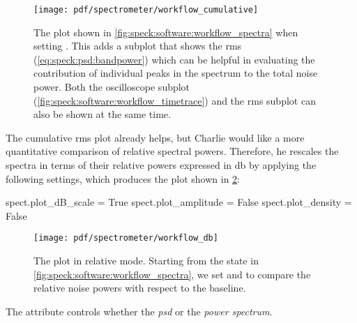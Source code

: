 \begin{figure}[htpb]
    \centering
    \texttt{[image: pdf/spectrometer/workflow\_cumulative]}
    \caption{
        The \pyspeck plot shown in \cref{fig:speck:software:workflow_spectra} when setting .
        This adds a subplot that shows the \gls{rms} (\cf \cref{eq:speck:psd:bandpower}) which can be helpful in evaluating the contribution of individual peaks in the spectrum to the total noise power.
        Both the oscilloscope subplot (\cref{fig:speck:software:workflow_timetrace}) and the \gls{rms} subplot can also be shown at the same time.
    }
    \label{fig:speck:software:workflow_cumulative}
\end{figure}

The cumulative \gls{rms} plot already helps, but Charlie would like a more quantitative comparison of relative spectral powers.
Therefore, he rescales the spectra in terms of their relative powers expressed in \unit{\decibel}
by applying the following settings, which produces the plot shown in \cref{fig:speck:software:workflow_db}:
\begin{py}
    spect.plot_dB_scale = True
    spect.plot_amplitude = False
    spect.plot_density = False
\end{py}
\begin{figure}[htpb]
    \centering
    \texttt{[image: pdf/spectrometer/workflow\_db]}
    \caption[The \pyspeck plot in relative mode.]{
        The \pyspeck plot in relative mode.
        Starting from the state in \cref{fig:speck:software:workflow_spectra}, we set  and  to compare the relative noise powers with respect to the baseline.
    }
    \label{fig:speck:software:workflow_db}
\end{figure}
The attribute  controls whether the \emph{\acrlong{psd}} or the \emph{power spectrum}.
